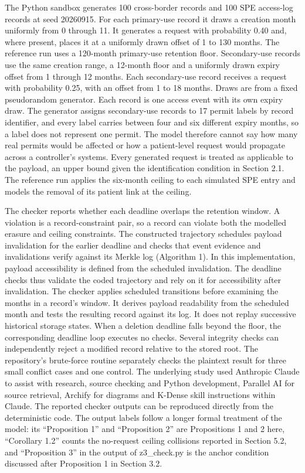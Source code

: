 \documentclass[5p,twocolumn]{elsarticle}
\begin{document}
The Python sandbox generates 100 cross-border records and 100 SPE
access-log records at seed 20260915. For each primary-use record it
draws a creation month uniformly from 0 through 11. It generates a
request with probability 0.40 and, where present, places it at a
uniformly drawn offset of 1 to 130 months. The reference run uses a
120-month primary-use retention floor. Secondary-use records use the
same creation range, a 12-month floor and a uniformly drawn expiry
offset from 1 through 12 months. Each secondary-use record receives a
request with probability 0.25, with an offset from 1 to 18 months. Draws
are from a fixed pseudorandom generator. Each record is one access event
with its own expiry draw. The generator assigns secondary-use records to
17 permit labels by record identifier, and every label carries between
four and six different expiry months, so a label does not represent one
permit. The model therefore cannot say how many real permits would be
affected or how a patient-level request would propagate across a
controller's systems. Every generated request is treated as applicable
to the payload, an upper bound given the identification condition in
Section 2.1. The reference run applies the six-month ceiling to each
simulated SPE entry and models the removal of its patient link at the
ceiling.

The checker reports whether each deadline overlaps the retention window.
A violation is a record-constraint pair, so a record can violate both
the modelled erasure and ceiling constraints. The constructed trajectory
schedules payload invalidation for the earlier deadline and checks that
event evidence and invalidations verify against its Merkle log
(Algorithm 1). In this implementation, payload accessibility is defined
from the scheduled invalidation. The deadline checks thus validate the
coded trajectory and rely on it for accessibility after invalidation.
The checker applies scheduled transitions before examining the months in
a record's window. It derives payload readability from the scheduled
month and tests the resulting record against its log. It does not replay
successive historical storage states. When a deletion deadline falls
beyond the floor, the corresponding deadline loop executes no checks.
Several integrity checks can independently reject a modified record
relative to the stored root. The repository's brute-force routine
separately checks the plaintext result for three small conflict cases
and one control. The underlying study used Anthropic Claude to assist
with research, source checking and Python development, Parallel AI for
source retrieval, Archify for diagrams and K-Dense skill instructions
within Claude. The reported checker outputs can be reproduced directly
from the deterministic code. The output labels follow a longer formal
treatment of the model: its ``Proposition 1'' and ``Proposition 2'' are
Propositions 1 and 2 here, ``Corollary 1.2'' counts the no-request
ceiling collisions reported in Section 5.2, and ``Proposition 3'' in the
output of z3\_check.py is the anchor condition discussed after
Proposition 1 in Section 3.2.
\end{document}
